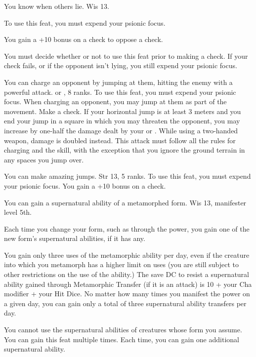 {You know when others lie.}
{Wis 13.}
{To use this feat, you must expend your psionic focus.

You gain a +10 bonus on a  check to oppose a  check.

You must decide whether or not to use this feat prior to making a  check. If your check fails, or if the opponent isn't lying, you still expend your psionic focus.}
{}{}

{You can charge an opponent by jumping at them, hitting the enemy with a powerful attack.}
{ or ,  8 ranks.}
{To use this feat, you must expend your psionic focus. When charging an opponent, you may jump at them as part of the movement. Make a  check. If your horizontal jump is at least 3 meters and you end your jump in a square in which you may threaten the opponent, you may increase by one-half the damage dealt by your  or . While using a two-handed weapon, damage is doubled instead. This attack must follow all the rules for charging and the  skill, with the exception that you ignore the ground terrain in any spaces you jump over.}
{}{}

{You can make amazing jumps.}
{Str 13,  5 ranks.}
{To use this feat, you must expend your psionic focus. You gain a +10 bonus on a  check.}
{}{}

{You can gain a supernatural ability of a metamorphed form.}
{Wis 13, manifester level 5th.}
{Each time you change your form, such as through the  power, you gain one of the new form's supernatural abilities, if it has any.

You gain only three uses of the metamorphic ability per day, even if the creature into which you metamorph has a higher limit on uses (you are still subject to other restrictions on the use of the ability.) The save DC to resist a supernatural ability gained through Metamorphic Transfer (if it is an attack) is 10 + your Cha modifier + \onehalf your Hit Dice. No matter how many times you manifest the  power on a given day, you can gain only a total of three supernatural ability transfers per day.}
{You cannot use the supernatural abilities of creatures whose form you assume.}
{You can gain this feat multiple times. Each time, you can gain one additional supernatural ability.}

